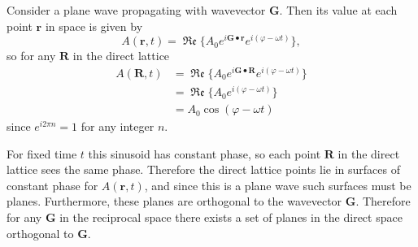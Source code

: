 \documentclass{article}
\renewcommand*{\Re}{\operatorname{\mathfrak{Re}}}
\begin{document}
\begin{enumerate}[label=(\alph*)]
{  Consider a plane wave propagating with wavevector $\mathbf{G}$. Then its
  value at each point $\mathbf{r}$ in space is given by
  $$
  A(\mathbf{r}, t) 
    = \Re\{A_0 e^{i \mathbf{G} \bullet \mathbf{r}} e^{i(\varphi - \omega t)}\},
  $$
  so for any $\mathbf{R}$ in the direct lattice
  \begin{align*}
  A(\mathbf{R}, t)
    &= \Re\{A_0 e^{i \mathbf{G} \bullet \mathbf{R}} e^{i(\varphi - \omega t)}\} \\
    &= \Re\{A_0 e^{i(\varphi - \omega t)}\} \\
    &= A_0 \cos (\varphi - \omega t)
  \end{align*}
  since $e^{i 2 \pi n} = 1$ for any integer $n$.

  For fixed time $t$ this sinusoid has constant phase, so each point 
  $\mathbf{R}$ in the direct lattice sees the same phase. Therefore the direct 
  lattice points lie in surfaces of constant phase for $A(\mathbf{r}, t)$, and 
  since this is a plane wave such surfaces must be planes. Furthermore, these
  planes are orthogonal to the wavevector $\mathbf{G}$. Therefore for any 
  $\mathbf{G}$ in the reciprocal space there exists a set of planes in the 
  direct space orthogonal to $\mathbf{G}$. 

}
\end{enumerate}
\end{document}
